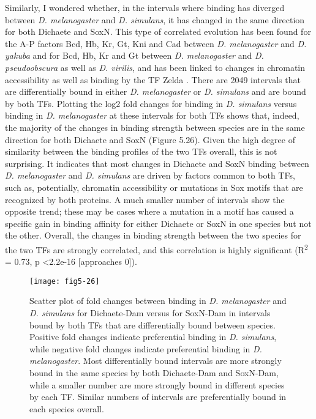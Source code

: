 Similarly, I wondered whether, in the intervals where binding has diverged between \emph{D. melanogaster} and \emph{D. simulans}, it has changed in the same direction for both Dichaete and SoxN. This type of correlated evolution has been found for the A-P factors Bcd, Hb, Kr, Gt, Kni and Cad between \emph{D. melanogaster} and \emph{D. yakuba} and for Bcd, Hb, Kr and Gt between \emph{D. melanogaster} and \emph{D. pseudoobscura} as well as \emph{D. virilis}, and has been linked to changes in chromatin accessibility as well as binding by the TF Zelda \citep{bradley_binding_2010,paris_extensive_2013}. There are 2049 intervals that are differentially bound in either \emph{D. melanogaster} or \emph{D. simulans} and are bound by both TFs. Plotting the log2 fold changes for binding in \emph{D. simulans} versus binding in \emph{D. melanogaster} at these intervals for both TFs shows that, indeed, the majority of the changes in binding strength between species are in the same direction for both Dichaete and SoxN (Figure 5.26). Given the high degree of similarity between the binding profiles of the two TFs overall, this is not surprising. It indicates that most changes in Dichaete and SoxN binding between \emph{D. melanogaster} and \emph{D. simulans} are driven by factors common to both TFs, such as, potentially, chromatin accessibility or mutations in Sox motifs that are recognized by both proteins. A much smaller number of intervals show the opposite trend; these may be cases where a mutation in a motif has caused a specific gain in binding affinity for either Dichaete or SoxN in one species but not the other. Overall, the changes in binding strength between the two species for the two TFs are strongly correlated, and this correlation is highly significant (R\textsuperscript{2} = 0.73, p \textless 2.2e-16 [approaches 0]).

\begin{figure}[H]
\centering
\texttt{[image: fig5-26]}
\caption{Scatter plot of fold changes between binding in \emph{D. melanogaster} and \emph{D. simulans} for Dichaete-Dam versus for SoxN-Dam in intervals bound by both TFs that are differentially bound between species. Positive fold changes indicate preferential binding in \emph{D. simulans}, while negative fold changes indicate preferential binding in \emph{D. melanogaster}. Most differentially bound intervals are more strongly bound in the same species by both Dichaete-Dam and SoxN-Dam, while a smaller number are more strongly bound in different species by each TF. Similar numbers of intervals are preferentially bound in each species overall.}
\label{Figure 5.26}
\end{figure}

